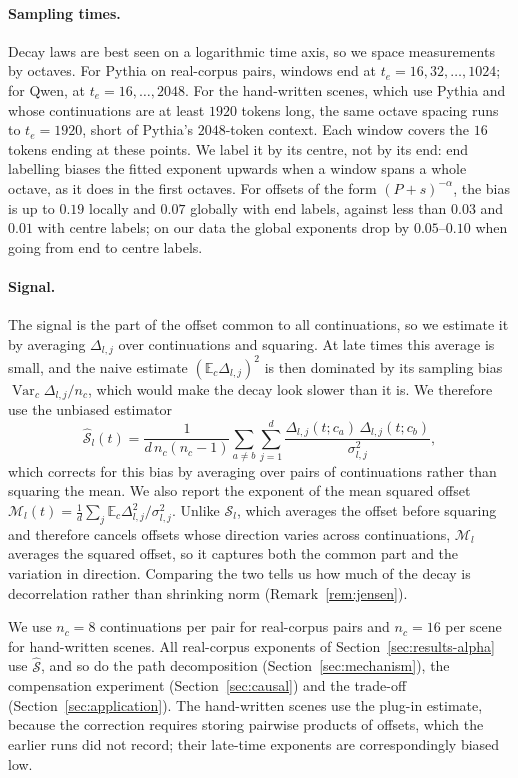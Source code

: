 \documentclass[11pt]{article}
\theoremstyle{definition}
\theoremstyle{remark}
\begin{document}
\paragraph{Sampling times.} Decay laws are best seen on a logarithmic time axis, so we space measurements by octaves. For Pythia on real-corpus pairs, windows end at $t_e=16,32,\dots,1024$; for Qwen, at $t_e=16,\dots,2048$. For the hand-written scenes, which use Pythia and whose continuations are at least $1920$ tokens long, the same octave spacing runs to $t_e=1920$, short of Pythia's $2048$-token context. Each window covers the $16$ tokens ending at these points. We label it by its centre, not by its end: end labelling biases the fitted exponent upwards when a window spans a whole octave, as it does in the first octaves. For offsets of the form $(P+s)^{-\alpha}$, the bias is up to $0.19$ locally and $0.07$ globally with end labels, against less than $0.03$ and $0.01$ with centre labels; on our data the global exponents drop by $0.05$--$0.10$ when going from end to centre labels.

\paragraph{Signal.} The signal is the part of the offset common to all continuations, so we estimate it by averaging $\Delta_{l,j}$ over continuations and squaring. At late times this average is small, and the naive estimate $(\mathbb E_c\Delta_{l,j})^2$ is then dominated by its sampling bias $\operatorname{Var}_c\Delta_{l,j}/n_c$, which would make the decay look slower than it is. We therefore use the unbiased estimator
\[
\widehat{\mathcal S}_l(t)=\frac{1}{d\,n_c(n_c-1)}\sum_{a\neq b}\sum_{j=1}^d\frac{\Delta_{l,j}(t;c_a)\,\Delta_{l,j}(t;c_b)}{\sigma_{l,j}^2},
\]
which corrects for this bias by averaging over pairs of continuations rather than squaring the mean. We also report the exponent of the mean squared offset $\mathcal M_l(t)=\frac1d\sum_j\mathbb E_c\Delta_{l,j}^2/\sigma_{l,j}^2$. Unlike $\mathcal S_l$, which averages the offset before squaring and therefore cancels offsets whose direction varies across continuations, $\mathcal M_l$ averages the squared offset, so it captures both the common part and the variation in direction. Comparing the two tells us how much of the decay is decorrelation rather than shrinking norm (Remark~\ref{rem:jensen}).

We use $n_c=8$ continuations per pair for real-corpus pairs and $n_c=16$ per scene for hand-written scenes. All real-corpus exponents of Section~\ref{sec:results-alpha} use $\widehat{\mathcal S}$, and so do the path decomposition (Section~\ref{sec:mechanism}), the compensation experiment (Section~\ref{sec:causal}) and the trade-off (Section~\ref{sec:application}). The hand-written scenes use the plug-in estimate, because the correction requires storing pairwise products of offsets, which the earlier runs did not record; their late-time exponents are correspondingly biased low.
\end{document}

